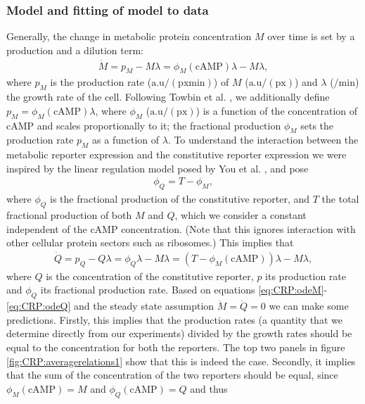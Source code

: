 \subsubsection{Model and fitting of model to data}
Generally, the change in metabolic protein concentration $M$ over time is set by a production and a dilution term:
\begin{align}
	\label{eq:CRP:odeM}
	\dot{M} = p_M - M \lambda = \phi_M(\text{cAMP}) \lambda -  M \lambda
	,
\end{align}
% 
where $p_M$ is the production rate ($\text{a.u}/(\text{px} \text{min})$) of $M$ ($\text{a.u}/(\text{px})$) and $\lambda$ ($/\text{min}$) the growth rate of the cell.
Following Towbin et al. \cite{Towbin2017}, we additionally define $p_M = \phi_M(\text{cAMP}) \lambda$, where $\phi_M$ ($\text{a.u}/(\text{px})$) is a function of the concentration of cAMP and scales proportionally to it; the fractional production $\phi_M$ sets the production rate $p_M$ as a function of $\lambda$.
%
To understand the interaction between the metabolic reporter expression and the constitutive reporter expression we were inspired by the linear regulation model posed by You et al. \cite{You2013}, and pose
\begin{align}
	\label{eq:CRP:relationMQ}
	\phi_Q = T - \phi_M
	,
\end{align}
where $\phi_Q$ is the fractional production of the constitutive reporter, and $T$ the total fractional production of both $M$ and $Q$, which we consider a constant independent of the cAMP concentration. 
(Note that this ignores interaction with other cellular protein sectors such as ribosomes.) 
%
This implies that
\begin{align}
	\label{eq:CRP:odeQ}
	\dot{Q} = p_Q - Q \lambda = \phi_Q \lambda -  M \lambda = (T - \phi_M(\text{cAMP})) \lambda -  M \lambda
	,
\end{align}
where $Q$ is the concentration of the constitutive reporter, $p$ its production rate and $\phi_Q$ its fractional production rate.
%
Based on equations \ref{eq:CRP:odeM}-\ref{eq:CRP:odeQ} and the steady state assumption $\dot{M}=\dot{Q}=0$ we can make some predictions. Firstly, this implies that the production rates (a quantity that we determine directly from our experiments) divided by the growth rates should be equal to the concentration for both the reporters. The top two panels in figure \ref{fig:CRP:averagerelations1} show that this is indeed the case. Secondly, it implies that the sum of the concentration of the two reporters should be equal, since $\phi_M(\text{cAMP}) = M$ and $\phi_Q(\text{cAMP}) = Q$ and thus 
